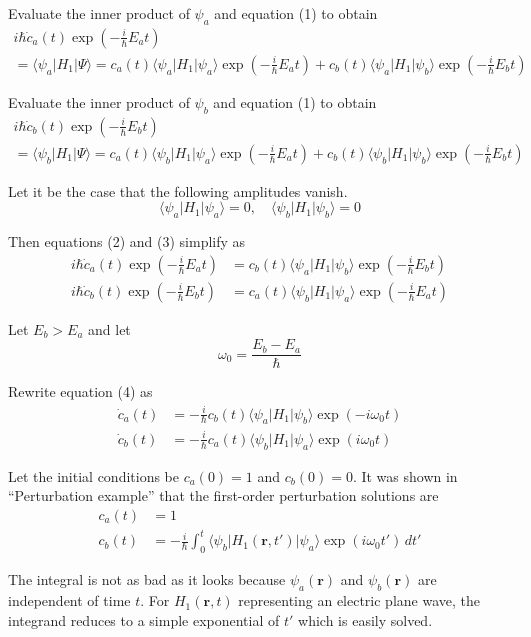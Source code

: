 Evaluate the inner product of $\psi_a$ and equation (1) to obtain
\begin{multline*}
i\hbar\dot c_a(t)\exp\left(-\tfrac{i}{\hbar}E_at\right)
\\
=\langle\psi_a|H_1|\Psi\rangle
=c_a(t)\langle\psi_a|H_1|\psi_a\rangle\exp\left(-\tfrac{i}{\hbar}E_at\right)
+c_b(t)\langle\psi_a|H_1|\psi_b\rangle\exp\left(-\tfrac{i}{\hbar}E_bt\right)
\tag{2}
\end{multline*}

Evaluate the inner product of $\psi_b$ and equation (1) to obtain
\begin{multline*}
i\hbar\dot c_b(t)\exp\left(-\tfrac{i}{\hbar}E_bt\right)
\\
=\langle\psi_b|H_1|\Psi\rangle
=c_a(t)\langle\psi_b|H_1|\psi_a\rangle\exp\left(-\tfrac{i}{\hbar}E_at\right)
+c_b(t)\langle\psi_b|H_1|\psi_b\rangle\exp\left(-\tfrac{i}{\hbar}E_bt\right)
\tag{3}
\end{multline*}

Let it be the case that the following amplitudes vanish.
\begin{equation*}
\langle\psi_a|H_1|\psi_a\rangle=0,\quad \langle\psi_b|H_1|\psi_b\rangle=0
\end{equation*}

Then equations (2) and (3) simplify as
\begin{equation*}
\begin{aligned}
i\hbar\dot c_a(t)\exp\left(-\tfrac{i}{\hbar}E_at\right)
&=c_b(t)\langle\psi_a|H_1|\psi_b\rangle\exp\left(-\tfrac{i}{\hbar}E_bt\right)
\\
i\hbar\dot c_b(t)\exp\left(-\tfrac{i}{\hbar}E_bt\right)
&=c_a(t)\langle\psi_b|H_1|\psi_a\rangle\exp\left(-\tfrac{i}{\hbar}E_at\right)
\end{aligned}
\tag{4}
\end{equation*}

Let $E_b>E_a$ and let
\begin{equation*}
\omega_0=\frac{E_b-E_a}{\hbar}
\end{equation*}

Rewrite equation (4) as
\begin{align*}
\dot c_a(t)&=-\frac{i}{\hbar}c_b(t)\langle\psi_a|H_1|\psi_b\rangle\exp(-i\omega_0t)
\\
\dot c_b(t)&=-\frac{i}{\hbar}c_a(t)\langle\psi_b|H_1|\psi_a\rangle\exp(i\omega_0t)
\end{align*}

Let the initial conditions be $c_a(0)=1$ and $c_b(0)=0$.
It was shown in ``Perturbation example'' that the first-order perturbation solutions are
\begin{align*}
c_a(t)&=1
\\
c_b(t)&=-\frac{i}{\hbar}\int_0^t
\langle\psi_b|H_1(\mathbf r,t')|\psi_a\rangle\exp(i\omega_0t')\,dt'
\end{align*}

The integral is not as bad as it looks because $\psi_a(\mathbf r)$ and $\psi_b(\mathbf r)$
are independent of time $t$.
For $H_1(\mathbf r,t)$ representing an electric plane wave,
the integrand reduces to a simple exponential of $t'$ which is easily solved.


